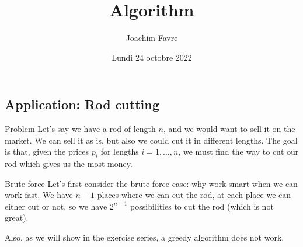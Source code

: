 \documentclass[a4paper]{article}
\title{Algorithm}
\author{Joachim Favre}
\date{Lundi 24 octobre 2022}
\begin{document}
\maketitle


\subsection{Application: Rod cutting}

\begin{parag}{Problem}
    Let's say we have a rod of length $n$, and we would want to sell it on the market. We can sell it as is, but also we could cut it in different lengths. The goal is that, given the prices $p_i$ for lengths $i=1, \ldots, n$, we must find the way to cut our rod which gives us the most money.
\end{parag}

\begin{parag}{Brute force}
    Let's first consider the brute force case: why work smart when we can work fast. We have $n-1$ places where we can cut the rod, at each place we can either cut or not, so we have $2^{n-1}$ possibilities to cut the rod (which is not great).

    Also, as we will show in the  exercise series, a greedy algorithm does not work.
\end{parag}
\end{document}
